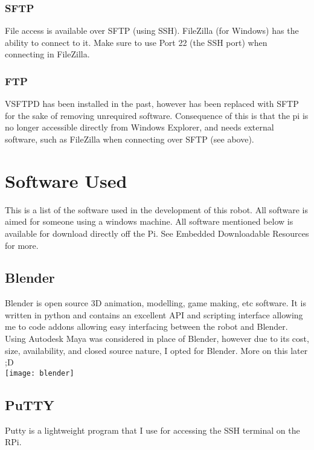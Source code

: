 				\subsubsection{SFTP}
					File access is available over SFTP (using SSH). FileZilla (for Windows) has the ability to connect to it. Make sure to use Port 22 (the SSH port) when connecting in FileZilla.
					
				\subsubsection{FTP}
					VSFTPD has been installed in the past, however has been replaced with SFTP for the sake of removing unrequired software. Consequence of this is that the pi is no longer accessible directly from Windows Explorer, and needs external software, such as FileZilla when connecting over SFTP (see above).
		
	\pagebreak
	
		\section{Software Used}
			This is a list of the software used in the development of this robot. All software is aimed for someone using a windows machine. All software mentioned below is available for download directly off the Pi. See Embedded Downloadable Resources for more.
		
			\subsection{Blender}
				Blender is open source 3D animation, modelling, game making, etc software. It is written in python and contains an excellent API and scripting interface allowing me to code addons allowing easy interfacing between the robot and Blender. Using Autodesk Maya was considered in place of Blender, however due to its cost, size, availability, and closed source nature, I opted for Blender. More on this later ;D\\
				
				\texttt{[image: blender]}
			
			\subsection{PuTTY}
				Putty is a lightweight program that I use for accessing the SSH terminal on the RPi.
				
